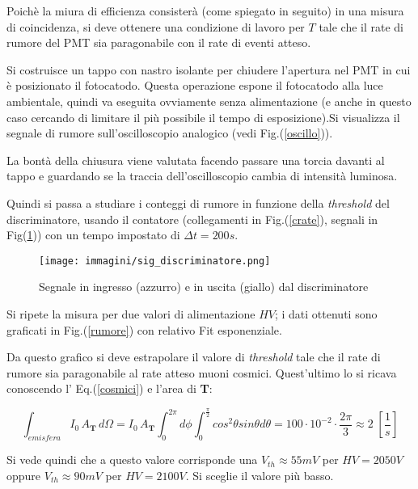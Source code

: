 \documentclass[12pt,a4paper,openright,twoside]{article}
\numberwithin{equation}{section} %
\begin{document}
Poichè la miura di efficienza consisterà (come spiegato in seguito) in una misura di coincidenza, si deve ottenere una condizione di lavoro per $T$ tale che il rate di rumore del PMT sia paragonabile con il rate di eventi atteso.

Si costruisce un tappo con nastro isolante per chiudere l'apertura nel PMT in cui è posizionato il fotocatodo. Questa operazione espone il fotocatodo alla luce ambientale, quindi va eseguita ovviamente senza alimentazione (e anche in questo caso cercando di limitare il più possibile il tempo di esposizione).Si visualizza il segnale di rumore sull'oscilloscopio analogico (vedi Fig.(\ref{oscillo})).




 La bontà della chiusura viene valutata facendo passare una torcia davanti al tappo e guardando se la traccia dell'oscilloscopio cambia di intensità luminosa.

Quindi si passa a studiare i conteggi di rumore in funzione della \textit{threshold} del discriminatore, usando il contatore (collegamenti in Fig.(\ref{crate}), segnali in Fig(\ref{discr})) con un tempo impostato di $\Delta t = 200 s $.

\begin{figure}[hbtp]
\centering
\texttt{[image: immagini/sig\_discriminatore.png]}
\caption{Segnale in ingresso (azzurro) e in uscita (giallo) dal discriminatore}
\label{discr}
\end{figure}


Si ripete la misura per due valori di alimentazione $HV$; i dati ottenuti sono graficati in Fig.(\ref{rumore}) con relativo Fit esponenziale.



Da questo grafico si deve estrapolare il valore di \textit{threshold} tale che il rate di rumore sia paragonabile al rate atteso muoni cosmici. Quest'ultimo lo si ricava conoscendo l' Eq.(\ref{cosmici}) e l'area di \textbf{T}:

\begin{equation}
\int_{emisfera} I_0 \, A_{\mathbf{T}} \, d\Omega=I_0 \, A_{\mathbf{T}}\int_0^{2\pi} d\phi \int_0 ^{\frac{\pi}{2}} cos^2 \theta sin \theta d\theta = 100 \cdot 10^{-2} \cdot \frac{2 \pi }{3} \approx 2 \; [\frac{1}{s}]
\end{equation}

Si vede quindi che a questo valore corrisponde una $V_{th} \approx 55 mV$ per $HV=2050V$ oppure $V_{th} \approx 90 mV$ per $HV=2100V$. Si sceglie il valore più basso.
\end{document}
